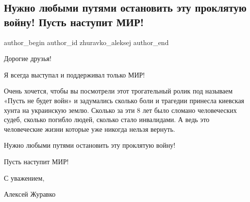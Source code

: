  
 
 
 
 
 
\subsection{Нужно любыми путями остановить эту проклятую войну! Пусть наступит МИР!}
\label{sec:01_12_2021.fb.zhuravko_aleksej.3.vojna_mir}
 
\ifcmt
 author_begin
   author_id zhuravko_aleksej
 author_end
\fi

Дорогие друзья! 

Я всегда выступал и поддерживал только МИР! 


Очень хочется, чтобы вы посмотрели этот трогательный ролик под называем «Пусть
не будет войн» и задумались сколько боли и трагедии принесла киевская хунта на
украинскую землю. Сколько за эти 8 лет было сломано человеческих судеб, сколько
погибло людей, сколько стало инвалидами. А ведь это человеческие жизни которые
уже никогда нельзя вернуть. 


Нужно любыми путями остановить эту проклятую войну!

Пусть наступит МИР! 

С уважением, 

Алексей Журавко

